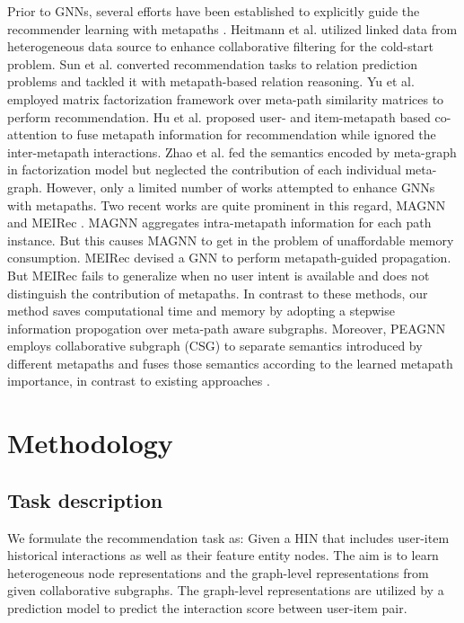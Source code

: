 \documentclass[runningheads, envcountsame, a4paper]{llncs}
\begin{document}
Prior to GNNs, several efforts have been established to 
explicitly guide the recommender learning with 
metapaths \cite{heitmann2010using,sun2012will,yu2013collaborative}. Heitmann et al. \cite{heitmann2010using} utilized linked data from heterogeneous data source to enhance collaborative filtering for the cold-start problem. 
Sun et al. \cite{sun2012will} converted recommendation tasks to relation prediction problems and tackled it with metapath-based relation reasoning. 
Yu et al. \cite{yu2013collaborative} employed matrix factorization framework over meta-path similarity matrices to perform recommendation.
Hu et al. \cite{hu2018leveraging} proposed user- and item-metapath based co-attention to fuse metapath information for recommendation while ignored the inter-metapath interactions. Zhao et al. \cite{zhao2017meta} fed the semantics encoded by meta-graph in factorization model but neglected the contribution of each individual meta-graph.
However, only a limited number of works attempted to enhance GNNs with metapaths. Two recent works are quite prominent in this regard, MAGNN \cite{fu2020magnn} and MEIRec \cite{fan2019metapath}.
MAGNN aggregates intra-metapath information for each path instance. But this causes MAGNN to get in the problem of unaffordable memory consumption. 
MEIRec devised a GNN to perform metapath-guided propagation. But MEIRec fails to generalize when no user intent is available and does not distinguish the contribution of metapaths. In contrast to these methods, our method saves computational time and memory by adopting a stepwise information propogation over meta-path aware subgraphs.
Moreover, PEAGNN employs collaborative subgraph (CSG) to separate semantics introduced by different metapaths and fuses those semantics according to the learned metapath importance, in contrast to existing approaches \cite{zhang2019inductive,fu2020magnn,fan2019metapath}.




 \section{Methodology}
\subsection{Task description}
We formulate the recommendation task as:
Given a HIN that includes user-item historical interactions as well as their feature entity nodes.
The aim is to learn heterogeneous node representations 
and the graph-level representations from given collaborative subgraphs.
The graph-level representations are utilized by a prediction model to predict the interaction score between user-item pair.
\end{document}
